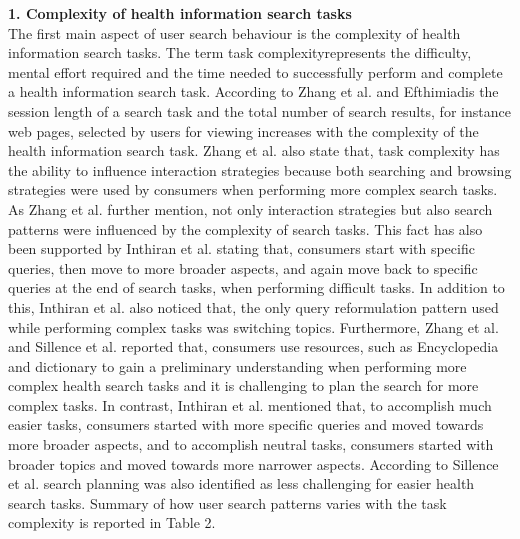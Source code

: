 \documentclass[]{article}
\begin{document}
\begin{center}
\end{center} 


\textbf{1. Complexity of health information search tasks} 
\\

The first main aspect of user search behaviour is the complexity of health information search tasks. The term \textquotesingle task complexity\textquotesingle represents the difficulty, mental effort required and the time needed to successfully perform and complete a health information search task. According to Zhang et al. and Efthimiadis \cite{zhang2012health,efthimiadis2009students} the session length of a search task and the total number of search results, for instance web pages, selected by users for viewing increases with the complexity of the health information search task. Zhang et al. \cite{zhang2012health} also state that, task complexity has the ability to influence interaction strategies because both searching and browsing strategies were used by consumers when performing more complex search tasks. As Zhang et al. \cite{zhang2012health} further mention, not only interaction strategies but also search patterns were influenced by the complexity of search tasks. This fact has also been supported by Inthiran et al. \cite{inthiran2016describing} stating that,  consumers start with specific queries, then move to more broader aspects, and again move back to specific queries at the end of search tasks, when performing difficult tasks. In addition to this, Inthiran et al. \cite{inthiran2016describing} also noticed that, the only query reformulation pattern used while performing complex tasks was \textquotesingle switching topics\textquotesingle. Furthermore, Zhang et al. and Sillence et al. \cite{zhang2012health,sillence2007patients} reported that, consumers use resources, such as Encyclopedia and dictionary to gain a preliminary understanding when performing more complex health search tasks and it is challenging to plan the search for more complex tasks. In contrast, Inthiran et al. \cite{inthiran2016describing} mentioned that, to accomplish much easier tasks, consumers started with more specific queries and moved towards more broader aspects, and to accomplish neutral tasks, consumers started with broader topics and moved towards more narrower aspects. According to Sillence et al. \cite{sillence2007patients} search planning was also identified as less challenging for easier health search tasks. Summary of how user search patterns varies with the task complexity is reported in Table 2. 
\end{document}

